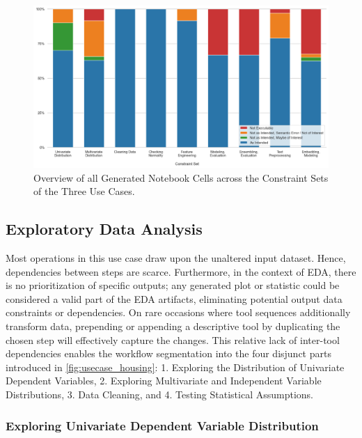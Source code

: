 \begin{figure}
    \centering
    \includegraphics[width=1\linewidth]{Tex//images//native_ape_eval/constraint_set_summary.png}
    \caption{Overview of all Generated Notebook Cells across the Constraint Sets of the Three Use Cases.}
    \label{fig:native_ape_summary_bar_plot}
\end{figure}

\subsection{Exploratory Data Analysis}

Most operations in this use case draw upon the unaltered input dataset. Hence, dependencies between steps are scarce. Furthermore, in the context of EDA, there is no prioritization of specific outputs; any generated plot or statistic could be considered a valid part of the EDA artifacts, eliminating potential output data constraints or dependencies. On rare occasions where tool sequences additionally transform data, prepending or appending a descriptive tool by duplicating the chosen step will effectively capture the changes. This relative lack of inter-tool dependencies enables the workflow segmentation into the four disjunct parts introduced in \autoref{fig:usecase_housing}: 1. Exploring the Distribution of Univariate Dependent Variables, 2. Exploring Multivariate and Independent Variable Distributions, 3. Data Cleaning, and 4. Testing Statistical Assumptions.

\subsubsection{Exploring Univariate Dependent Variable Distribution}

